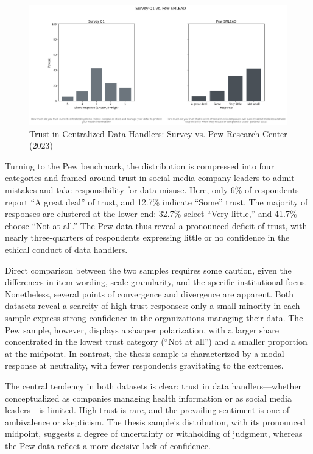		\begin{figure}[h!]\centering
			\includegraphics[width=1\linewidth]{figures/img/Pew_comparison_plots/compare_1_vs_SMLEAD.png}
			\caption{Trust in Centralized Data Handlers: Survey vs. Pew Research Center (2023)}
			\label{fig:trust_Pew_comparison}
		\end{figure}
		Turning to the Pew benchmark, the distribution is compressed into four categories and framed around trust in social media company leaders to admit mistakes and take responsibility for data misuse. Here, only 6\% of respondents report “A great deal” of trust, and 12.7\% indicate “Some” trust. The majority of responses are clustered at the lower end: 32.7\% select “Very little,” and 41.7\% choose “Not at all.” The Pew data thus reveal a pronounced deficit of trust, with nearly three-quarters of respondents expressing little or no confidence in the ethical conduct of data handlers.
		
		Direct comparison between the two samples requires some caution, given the differences in item wording, scale granularity, and the specific institutional focus. Nonetheless, several points of convergence and divergence are apparent. Both datasets reveal a scarcity of high-trust responses: only a small minority in each sample express strong confidence in the organizations managing their data. The Pew sample, however, displays a sharper polarization, with a larger share concentrated in the lowest trust category (“Not at all”) and a smaller proportion at the midpoint. In contrast, the thesis sample is characterized by a modal response at neutrality, with fewer respondents gravitating to the extremes.
		
		The central tendency in both datasets is clear: trust in data handlers—whether conceptualized as companies managing health information or as social media leaders—is limited. High trust is rare, and the prevailing sentiment is one of ambivalence or skepticism. The thesis sample’s distribution, with its pronounced midpoint, suggests a degree of uncertainty or withholding of judgment, whereas the Pew data reflect a more decisive lack of confidence.
		
